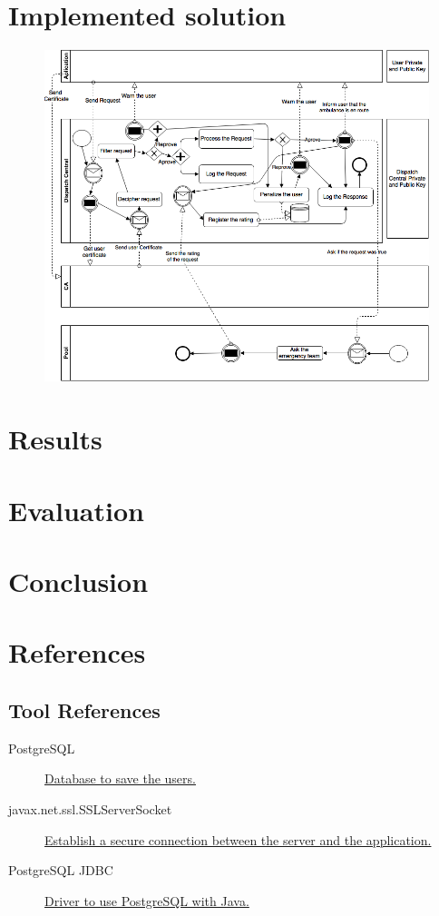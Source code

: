 \documentclass[a4paper,titlepage,11pt]{article}
\begin{document}
\section{Implemented solution}

\begin{figure}[h]
    \centering
    \includegraphics[scale=0.50]{img/advanced-solution.png}
\end{figure}


\section{Results}

\section{Evaluation}

\section{Conclusion}

\section{References}

\subsection{Tool References}
\begin{description}
  \item [PostgreSQL] \href{https://www.postgresql.org}{Database to save the users.}
  \item [javax.net.ssl.SSLServerSocket] \href{https://docs.oracle.com/javase/7/docs/api/java/net/Socket.html}{Establish a secure connection between the server and the application.}
  \item [PostgreSQL JDBC] \href{https://jdbc.postgresql.org}{Driver to use PostgreSQL with Java.}
\end{description}
\end{document}
